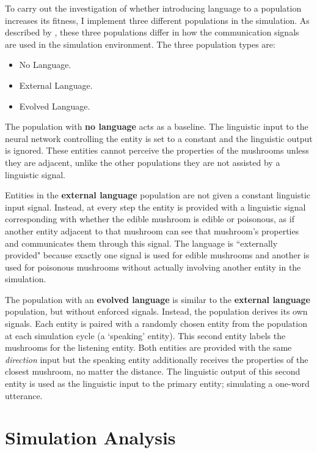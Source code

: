 \documentclass[12pt,a4paper]{report}
\begin{document}
To carry out the investigation of whether introducing language to a population increases its fitness, I implement three different populations in the simulation. As described by \cite{Cangelosi1998}, these three populations differ in how the communication signals are used in the simulation environment. The three population types are:

\begin{itemize}
	\item No Language.
	\item External Language.
	\item Evolved Language.
\end{itemize}

The population with {\bf no language} acts as a baseline. The linguistic input to the neural network controlling the entity is set to a constant and the linguistic output is ignored. These entities cannot perceive the properties of the mushrooms unless they are adjacent, unlike the other populations they are not assisted by a linguistic signal.

Entities in the {\bf external language} population are not given a constant linguistic input signal. Instead, at every step the entity is provided with a linguistic signal corresponding with whether the edible mushroom is edible or poisonous, as if another entity adjacent to that mushroom can see that mushroom's properties and communicates them through this signal. The language is ``externally provided" because exactly one signal is used for edible mushrooms and another is used for poisonous mushrooms without actually involving another entity in the simulation. 

The population with an {\bf evolved language} is similar to the {\bf external language} population, but without enforced signals. Instead, the population derives its own signals. Each entity is paired with a randomly chosen entity from the population at each simulation cycle (a `speaking' entity). This second entity labels the mushrooms for the listening entity. Both entities are provided with the same \emph{direction} input but the speaking entity additionally receives the properties of the closest mushroom, no matter the distance. The linguistic output of this second entity is used as the linguistic input to the primary entity; simulating a one-word utterance.

\section{Simulation Analysis}\label{section:analysis}
\end{document}
